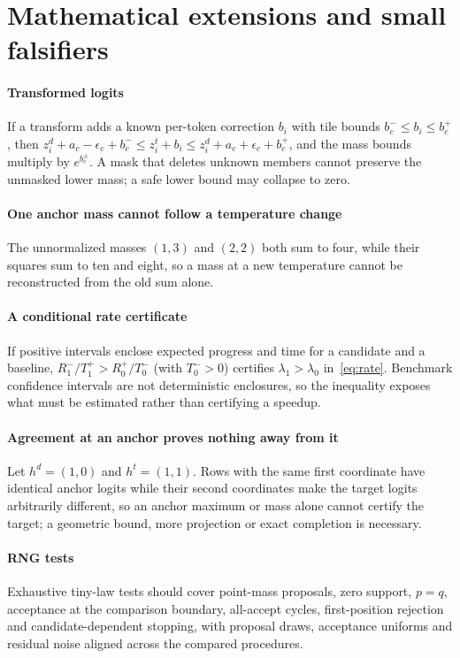 \section{Mathematical extensions and small falsifiers}\label{app:math}
\paragraph{Transformed logits} If a transform adds a known per-token correction $b_i$ with tile bounds $b_c^-\le b_i\le b_c^+$, then $z_i^d+a_c-\epsilon_c+b_c^-\le z_i^t+b_i\le z_i^d+a_c+\epsilon_c+b_c^+$, and the mass bounds multiply by $e^{b_c^\pm}$. A mask that deletes unknown members cannot preserve the unmasked lower mass; a safe lower bound may collapse to zero.

\paragraph{One anchor mass cannot follow a temperature change} The unnormalized masses $(1,3)$ and $(2,2)$ both sum to four, while their squares sum to ten and eight, so a mass at a new temperature cannot be reconstructed from the old sum alone.

\paragraph{A conditional rate certificate} If positive intervals enclose expected progress and time for a candidate and a baseline, $R_1^-/T_1^+>R_0^+/T_0^-$ (with $T_0^->0$) certifies $\lambda_1>\lambda_0$ in~\eqref{eq:rate}. Benchmark confidence intervals are not deterministic enclosures, so the inequality exposes what must be estimated rather than certifying a speedup.

\paragraph{Agreement at an anchor proves nothing away from it} Let $h^d=(1,0)$ and $h^t=(1,1)$. Rows with the same first coordinate have identical anchor logits while their second coordinates make the target logits arbitrarily different, so an anchor maximum or mass alone cannot certify the target; a geometric bound, more projection or exact completion is necessary.

\paragraph{RNG tests} Exhaustive tiny-law tests should cover point-mass proposals, zero support, $p=q$, acceptance at the comparison boundary, all-accept cycles, first-position rejection and candidate-dependent stopping, with proposal draws, acceptance uniforms and residual noise aligned across the compared procedures.

